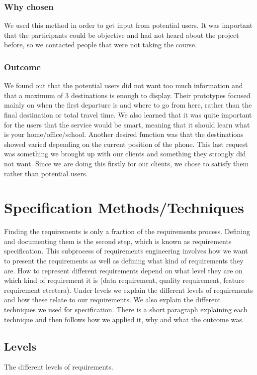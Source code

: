 \documentclass[a4paper]{article}
\begin{document}
		\subsubsection{Why chosen}
We used this method in order to get input from potential users. It was important that the participants could be objective and had not heard about the project before, so we contacted people that were not taking the course.
		\subsubsection{Outcome}
We found out that the potential users did not want too much information and that a maximum of 3 destinations is enough to display. Their prototypes focused mainly on when the first departure is and where to go from here, rather than the final destination or total travel time. We also learned that it was quite important for the users that the service would be smart, meaning that it should learn what is your home/office/school. Another desired function was that the destinations showed varied depending on the current position of the phone. This last request was something we brought up with our clients and something they strongly did not want. Since we are doing this firstly for our clients, we chose to satisfy them rather than potential users.
	
	\section{Specification Methods/Techniques}
	Finding the requirements is only a fraction of the requirements process. Defining and documenting them is the second step, which is known as requirements specification. This subprocess of requirements engineering involves how we want to present the requirements as well as defining what kind of requirements they are. How to represent different requirements depend on what level they are on which kind of requirement it is (data requirement, quality requirement, feature requirement etcetera). Under
levels we explain the different levels of requirements and how these relate to our requirements.  We also explain the different techniques we used for specification. There is a short paragraph explaining each technique and then follows how we applied it, why and what the outcome was.

		\subsection{Levels}
		The different levels of requirements.
		
\end{document}
